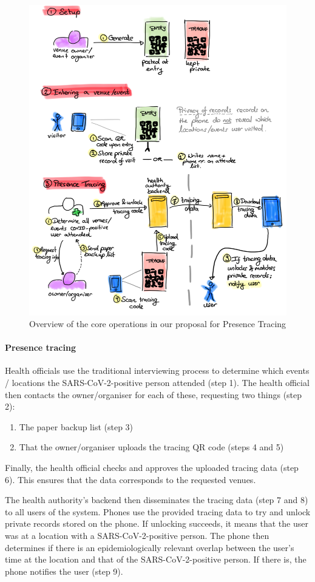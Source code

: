 \begin{figure}
  \includegraphics[width=\textwidth]{figures/overview}
  \caption{\label{fig:overview}Overview of the core operations in our proposal for Presence Tracing}
\end{figure}

\paragraph{Presence tracing}
Health officials use the traditional interviewing process to determine which events / locations the SARS-CoV-2-positive person attended (step 1). The health official then contacts the owner/organiser for each of these, requesting two things (step 2):

\begin{enumerate}
\item The paper backup list (step 3)
\item That the owner/organiser uploads the tracing QR code (steps 4 and 5)
\end{enumerate}

Finally, the health official checks and approves the uploaded tracing data (step 6). This ensures that the data corresponds to the requested venues.

The health authority’s backend then disseminates the tracing data (step 7 and 8) to all users of the system. Phones use the provided tracing data to try and unlock private records stored on the phone. If unlocking succeeds, it means that the user was at a location with a SARS-CoV-2-positive person. The phone then determines if there is an epidemiologically relevant overlap between the user’s time at the location and that of the SARS-CoV-2-positive person. If there is, the phone notifies the user (step 9).

